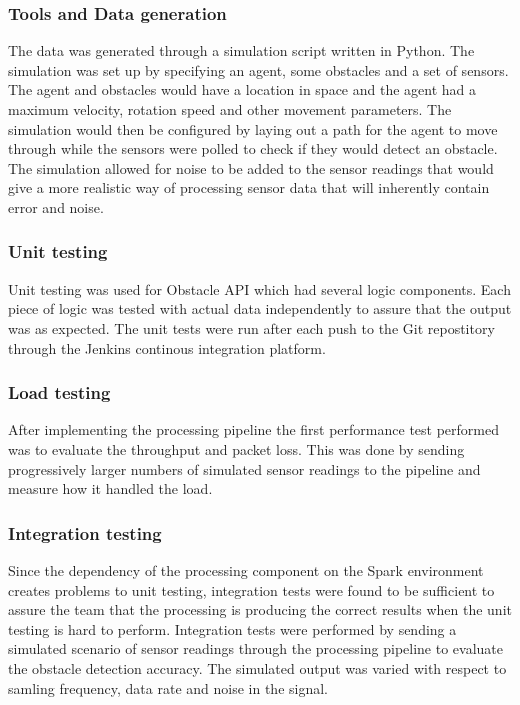 \documentclass[prodmode,acmtosem]{acmsmall} %
\begin{document}
\subsubsection{Tools and Data generation}
The data was generated through a simulation script written in Python. The simulation was set up by specifying an agent, some obstacles and a set of sensors. The agent and obstacles would have a location in space and the agent had a maximum velocity, rotation speed and other movement parameters. The simulation would then be configured by laying out a path for the agent to move through while the sensors were polled to check if they would detect an obstacle. The simulation allowed for noise to be added to the sensor readings that would give a more realistic way of processing sensor data that will inherently contain error and noise.

\subsubsection{Unit testing}
Unit testing was used for Obstacle API which had several logic components. Each piece of logic was tested with actual data independently to assure that the output was as expected. The unit tests were run after each push to the Git repostitory through the Jenkins continous integration platform.


\subsubsection{Load testing}
After implementing the processing pipeline the first performance test performed was to evaluate the throughput and packet loss. This was done by sending progressively larger numbers of simulated sensor readings to the pipeline and measure how it handled the load.

\subsubsection{Integration testing}
Since the dependency of the processing component on the Spark environment creates  problems to unit testing, integration tests were found to be sufficient to assure the team that the processing is producing the correct results when the unit testing is hard to perform. Integration tests were performed by sending a simulated scenario of sensor readings through the processing pipeline to evaluate the obstacle detection accuracy. The simulated output was varied with respect to samling frequency, data rate and noise in the signal.
\end{document}
